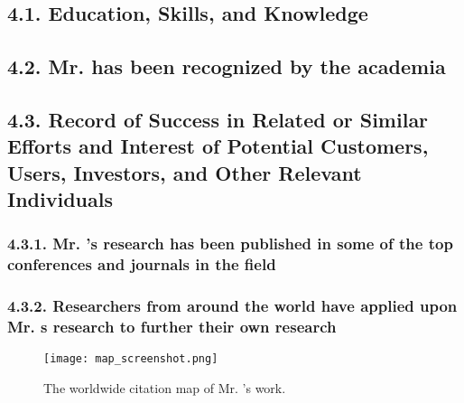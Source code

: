 \subsection{\texorpdfstring{4.1. Education, Skills, and Knowledge}{4.1. Education, Skills, and Knowledge}}\label{education-skills-and-knowledge}

\subsection{\texorpdfstring{4.2. Mr. \myname has been recognized by the academia}{4.2. Mr. \myname has been recognized by the academia}}\label{mr.-xxx-has-been-recognized-by-the-academia}

\subsection{\texorpdfstring{4.3. Record of Success in Related or Similar Efforts and Interest of Potential Customers, Users, Investors, and Other Relevant Individuals}{4.3. Record of Success in Related or Similar Efforts and Interest of Potential Customers, Users, Investors, and Other Relevant Individuals}}\label{record-of-success-in-related-or-similar-efforts-and-interest-of-potential-customers-users-investors-and-other-relevant-individuals}

\subsubsection{\texorpdfstring{4.3.1. Mr. \myname's research has been published in some of the top conferences and journals in the field}{4.3.1. Mr. \myname's research has been published in some of the top conferences and journals in the field }}\label{mr.-xxx-research-has-been-published-in-some-of-the-top-conferences-and-journals-in-the-field}

\subsubsection{\texorpdfstring{4.3.2. Researchers from around the world have applied upon Mr. \myname\textquotesingle{}s research to further their own research }{ 4.3.2. Researchers from around the world have applied upon Mr. \myname's research to further their own research }}\label{researchers-from-around-the-world-have-applied-upon-mr.-xxx-research-to-further-their-own-research}

\begin{figure}
    \centering
    \texttt{[image: map\_screenshot.png]}
    \caption{The worldwide citation map of Mr. \myname's work.}
    \label{fig:citation_map}
\end{figure}

